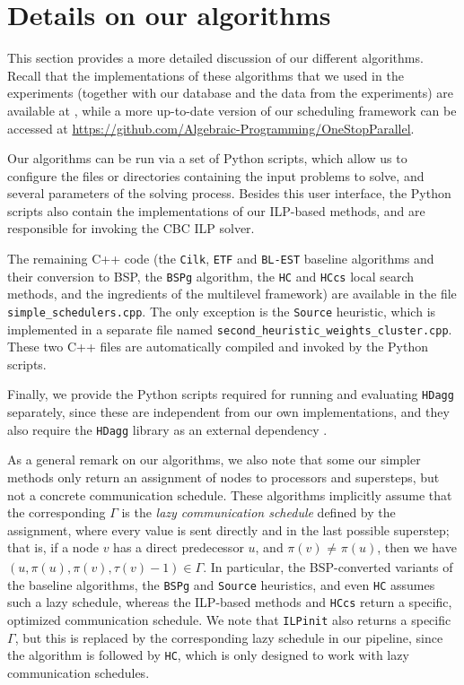 \documentclass[sigconf,nonacm]{acmart}
\begin{document}

\balance


\newpage

\appendix

\section{Details on our algorithms} \label{app:algos}

This section provides a more detailed discussion of our different algorithms. Recall that the implementations of these algorithms that we used in the experiments (together with our database and the data from the experiments) are available at \cite{folder}, while a more up-to-date version of our scheduling framework can be accessed at \url{https://github.com/Algebraic-Programming/OneStopParallel}. 

Our algorithms can be run via a set of Python scripts, which allow us to configure the files or directories containing the input problems to solve, and several parameters of the solving process. Besides this user interface, the Python scripts also contain the implementations of our ILP-based methods, and are responsible for invoking the CBC ILP solver.

The remaining C++ code (the \texttt{Cilk}, \texttt{ETF} and \texttt{BL-EST} baseline algorithms and their conversion to BSP, the \texttt{BSPg} algorithm, the \texttt{HC} and \texttt{HCcs} local search methods, and the ingredients of the multilevel framework) are available in the file \texttt{simple\_schedulers.cpp}. The only exception is the \texttt{Source} heuristic, which is implemented in a separate file named \texttt{second\_heuristic\_weights\_cluster.cpp}. These two C++ files are automatically compiled and invoked by the Python scripts.

Finally, we provide the Python scripts required for running and evaluating \texttt{HDagg} separately, since these are independent from our own implementations, and they also require the \texttt{HDagg} library as an external dependency \cite{hdagg}.

As a general remark on our algorithms, we also note that some our simpler methods only return an assignment of nodes to processors and supersteps, but not a concrete communication schedule. These algorithms implicitly assume that the corresponding $\Gamma$ is the \textit{lazy communication schedule} defined by the assignment, where every value is sent directly and in the last possible superstep; that is, if a node $v$ has a direct predecessor $u$, and $\pi(v) _{\!} \neq _{\!} \pi(u)$, then we have $(u, \pi(u), \pi(v), \tau(v)-1) \in \Gamma$. In particular, the BSP-converted variants of the baseline algorithms, the \texttt{BSPg} and \texttt{Source} heuristics, and even \texttt{HC} assumes such a lazy schedule, whereas the ILP-based methods and \texttt{HCcs} return a specific, optimized communication schedule. We note that \texttt{ILPinit} also returns a specific $\Gamma$, but this is replaced by the corresponding lazy schedule in our pipeline, since the algorithm is followed by \texttt{HC}, which is only designed to work with lazy communication schedules.
\end{document}
